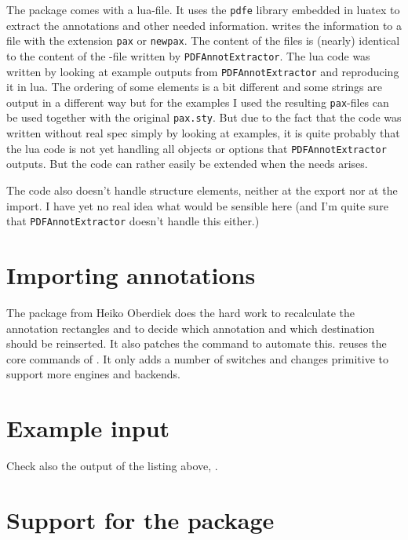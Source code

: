 \documentclass[DIV=12,parskip=half-,bibliography=totoc]{scrartcl}
\begin{document}
The  package comes with a lua-file. It uses the \texttt{pdfe} library embedded in luatex to extract the annotations and other needed information.  writes the information to a file with the extension \texttt{pax} or \texttt{newpax}. The content of the files is (nearly) identical to the content of the -file written by \texttt{PDFAnnotExtractor}. The lua code was written by looking at example outputs from \texttt{PDFAnnotExtractor} and reproducing it in lua. The ordering of some elements is a bit different and some strings are output in a different way but for the examples I used the resulting \texttt{pax}-files can be used together with the original \texttt{pax.sty}. But due to the fact that the code was written without real spec simply by looking at examples, it is quite probably that the lua code is not yet handling all objects or options that \texttt{PDFAnnotExtractor} outputs.  But the code can rather easily be extended when the needs arises.

The code also doesn't handle structure elements, neither at the export nor at the import. I have yet no real idea what would be sensible here (and I'm quite sure that \texttt{PDFAnnotExtractor}  doesn't handle this either.)


\section{Importing annotations}

The  package from Heiko Oberdiek does the hard work to recalculate the annotation rectangles and to decide which annotation and which destination should be reinserted. It also patches the  command to automate this.
 reuses the core commands of . It only adds a number of switches and changes primitive to support more engines and backends.



\section{Example input}


Check also the output of the listing above, .

\section{Support for the  package}
\end{document}
